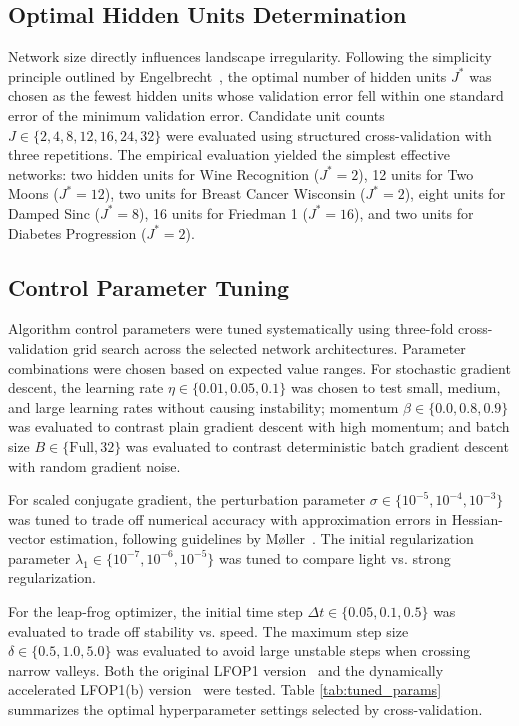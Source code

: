 \documentclass[conference,10pt]{IEEEtran}
\begin{document}
\subsection{Optimal Hidden Units Determination}
Network size directly influences landscape irregularity. Following the simplicity principle outlined by Engelbrecht~\cite{engelbrecht2007}, the optimal number of hidden units $J^*$ was chosen as the fewest hidden units whose validation error fell within one standard error of the minimum validation error. Candidate unit counts $J \in \{2, 4, 8, 12, 16, 24, 32\}$ were evaluated using structured cross-validation with three repetitions. The empirical evaluation yielded the simplest effective networks: two hidden units for Wine Recognition ($J^* = 2$), 12 units for Two Moons ($J^* = 12$), two units for Breast Cancer Wisconsin ($J^* = 2$), eight units for Damped Sinc ($J^* = 8$), 16 units for Friedman 1 ($J^* = 16$), and two units for Diabetes Progression ($J^* = 2$).

\subsection{Control Parameter Tuning}
Algorithm control parameters were tuned systematically using three-fold cross-validation grid search across the selected network architectures. Parameter combinations were chosen based on expected value ranges. For stochastic gradient descent, the learning rate $\eta \in \{0.01, 0.05, 0.1\}$ was chosen to test small, medium, and large learning rates without causing instability; momentum $\beta \in \{0.0, 0.8, 0.9\}$ was evaluated to contrast plain gradient descent with high momentum; and batch size $B \in \{\text{Full}, 32\}$ was evaluated to contrast deterministic batch gradient descent with random gradient noise.

For scaled conjugate gradient, the perturbation parameter $\sigma \in \{10^{-5}, 10^{-4}, 10^{-3}\}$ was tuned to trade off numerical accuracy with approximation errors in Hessian-vector estimation, following guidelines by M\o{}ller~\cite{moller1993}. The initial regularization parameter $\lambda_1 \in \{10^{-7}, 10^{-6}, 10^{-5}\}$ was tuned to compare light vs. strong regularization.

For the leap-frog optimizer, the initial time step $\Delta t \in \{0.05, 0.1, 0.5\}$ was evaluated to trade off stability vs. speed. The maximum step size $\delta \in \{0.5, 1.0, 5.0\}$ was evaluated to avoid large unstable steps when crossing narrow valleys. Both the original LFOP1 version~\cite{snyman1982} and the dynamically accelerated LFOP1(b) version~\cite{snyman1983} were tested. Table \ref{tab:tuned_params} summarizes the optimal hyperparameter settings selected by cross-validation.
\end{document}
